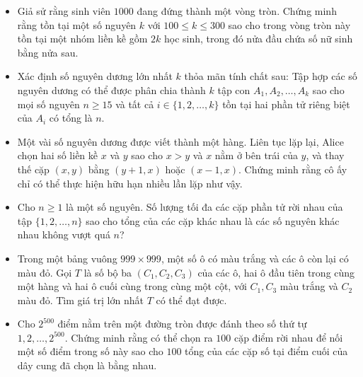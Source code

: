 \documentclass[11pt]{scrartcl}
\begin{document}
\begin{itemize}[label=, leftmargin=0em, itemsep=0.5em]
    \item \begin{btvn}
        Giả sử rằng sinh viên $1000$ đang đứng thành một vòng tròn. Chứng minh rằng tồn tại một số nguyên $k$ với $100 \leq k \leq 300$ sao cho trong vòng tròn này tồn tại một nhóm liền kề gồm $2k$ học sinh, trong đó nửa đầu chứa số nữ sinh bằng nửa sau.
    \end{btvn}



    \item \begin{btvn}
        Xác định số nguyên dương lớn nhất $k$ thỏa mãn tính chất sau: Tập hợp các số nguyên dương có thể được phân chia thành $k$ tập con $A_1, A_2, \ldots, A_k$ sao cho mọi số nguyên $n \geq 15$ và tất cả $i \in \{1, 2, \ldots, k\}$ tồn tại hai phần tử riêng biệt của $A_i$ có tổng là $n$.
    \end{btvn}

    \item \begin{btvn}
        Một vài số nguyên dương được viết thành một hàng. Liên tục lặp lại, Alice chọn hai số liền kề $x$ và $y$ sao cho $x>y$ và $x$ nằm ở bên trái của $y$, và thay thế cặp $(x,y)$ bằng $(y +1,x)$ hoặc $(x-1,x)$. Chứng minh rằng cô ấy chỉ có thể thực hiện hữu hạn nhiều lần lặp như vậy.
    \end{btvn}

    \item \begin{btvn}
        Cho $n \geq 1$ là một số nguyên. Số lượng tối đa các cặp phần tử rời nhau của tập $\{ 1,2,\ldots , n \}$ sao cho tổng của các cặp khác nhau là các số nguyên khác nhau không vượt quá $n$?
    \end{btvn}

    \item \begin{btvn}
    Trong một bảng vuông $999 \times 999$, một số ô có màu trắng và các ô còn lại có màu đỏ. Gọi $T$ là số bộ ba $(C_1,C_2,C_3)$ của các ô, hai ô đầu tiên trong cùng một hàng và hai ô cuối cùng trong cùng một cột, với $C_1,C_3$ màu trắng và $C_2$ màu đỏ. Tìm giá trị lớn nhất $T$ có thể đạt được.
    \end{btvn}


    \item \begin{btvn}
        Cho $2^{500}$ điểm nằm trên một đường tròn được đánh theo số thứ tự $1,2,\dots,2^{500}$. Chứng minh rằng có thể chọn ra $100$ cặp điểm rời nhau để nối một số điểm trong số này sao cho $100$ tổng của các cặp số tại điểm cuối của dây cung đã chọn là bằng nhau.
    \end{btvn}


\end{itemize}
\end{document}
